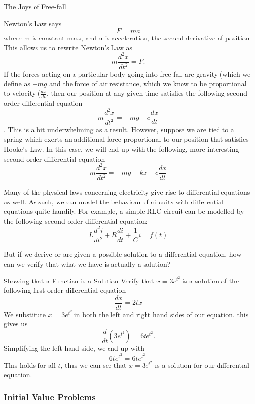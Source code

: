 \begin{example} The Joys of Free-fall \newline

Newton's Law says $$F=ma$$ where m is constant mass, and a is acceleration, the second derivative of position. This allows us to rewrite Newton's Law as $$m \frac{d^2x}{dt^2} = F.$$ If the forces acting on a particular body going into free-fall are gravity (which we define as $-mg$ and the force of air resistance, which we know to be proportional to velocity ($\frac{dx}{dt}$, then our position at any given time satisfies the following second order differential equation
$$m\frac{d^2x}{dt^2} = -mg - c\frac{dx}{dt}$$. This is a bit underwhelming as a result. However, suppose we are tied to a spring which exerts an additional force proportional to our position that satisfies Hooke's Law. In this case, we will end up with the following, more interesting second order differential equation $$m\frac{d^2x}{dt^2} = -mg -kx -c\frac{dx}{dt}$$
\end{example}

Many of the physical laws concerning electricity give rise to differential equations as well. As such, we can model the behaviour of circuits with differential equations quite handily. For example, a simple RLC circuit can be modelled by the following second-order differential equation:
$$L\frac{d^2i}{dt^2}+R\frac{di}{dt}+\frac{1}{C}i = f(t)$$

But if we derive or are given a possible solution to a differential equation, how can we verify that what we have is actually a solution?

\begin{example} Showing that a Function is a Solution\newline
Verify that $x=3e^{t^2}$ is a solution of the following first-order differential equation
$$\frac{dx}{dt} = 2tx$$
We substitute $x=3e^{t^2}$ in both the left and right hand sides of our equation. this gives us $$\frac{d}{dt}(3e^{t^2}) = 6te^{t^2}.$$
Simplifying the left hand side, we end up with $$6te^{t^2}=6te^{t^2}.$$ This holds for all $t$, thus we can see that  $x=3e^{t^2}$  is a solution for our differential equation.

\end{example}

\subsubsection{Initial Value Problems}

